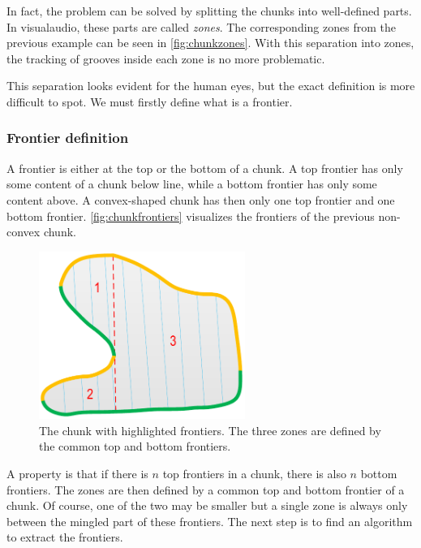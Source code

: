 In fact, the problem can be solved by splitting the chunks into well-defined parts. In \gls{visualaudio}, these parts are called \emph{zones}. The corresponding zones from the previous example can be seen in \autoref{fig:chunkzones}. With this separation into zones, the tracking of grooves inside each zone is no more problematic.

This separation looks evident for the human eyes, but the exact definition is more difficult to spot. We must firstly define what is a frontier.

\subsubsection{Frontier definition}

A frontier is either at the top or the bottom of a chunk. A top frontier has only some content of a chunk below line, while a bottom frontier has only some content above. A convex-shaped chunk has then only one top frontier and one bottom frontier. \autoref{fig:chunkfrontiers} visualizes the frontiers of the previous non-convex chunk.

\begin{figure}[!ht]
\centering
\includegraphics[width=0.6\textwidth]{images/chunk-frontiers}
\caption[The chunk with highlighted frontiers.]
{The chunk with highlighted frontiers. The three zones are defined by the common top and bottom frontiers.}
\label{fig:chunkfrontiers}
\end{figure}

A property is that if there is $n$ top frontiers in a chunk, there is also $n$ bottom frontiers. The zones are then defined by a common top and bottom frontier of a chunk. Of course, one of the two may be smaller but a single zone is always only between the mingled part of these frontiers. The next step is to find an algorithm to extract the frontiers.

